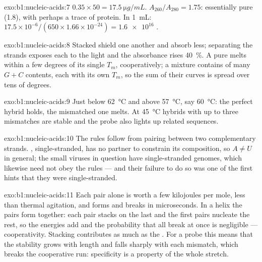 \begin{solution}{exo:b1:nucleic-acids:7}
$0.35\times 50 = \qty{17.5}{\micro g/mL}$. $A_{260}/A_{280} = 1.75$:
essentially pure  (1.8), with perhaps a trace of protein. In
\qty{1}{mL}: $17.5\times 10^{-6}/(650\times 1.66\times 10^{-24}) =
\num{1.6e16}$ .
\end{solution}

\begin{solution}{exo:b1:nucleic-acids:8}
Stacked  shield one another and absorb less; separating the
strands exposes each  to the light and the absorbance rises
\qty{40}{\%}. A pure  melts within a few degrees of its single
$T_m$, cooperatively; a mixture contains  of many $G + C$ contents,
each with its own $T_m$, so the sum of their curves is spread over
tens of degrees.
\end{solution}

\begin{solution}{exo:b1:nucleic-acids:9}
Just below \qty{62}{\celsius} and above \qty{57}{\celsius}, say
\qty{60}{\celsius}: the perfect hybrid holds, the mismatched one
melts. At \qty{45}{\celsius} hybrids with up to three mismatches are
stable and the probe also lights up related sequences.
\end{solution}

\begin{solution}{exo:b1:nucleic-acids:10}
The rules follow from  pairing between two complementary strands.
, single-stranded, has no partner to constrain its composition, so
$A \neq U$ in general; the small viruses in question have
single-stranded  genomes, which likewise need not obey the rules ---
and their failure to do so was one of the first hints that they were
single-stranded.
\end{solution}

\begin{solution}{exo:b1:nucleic-acids:11}
Each pair alone is worth a few kilojoules per mole, less than thermal
agitation, and forms and breaks in microseconds. In a helix the pairs
form together: each pair stacks on the last and the first pairs
nucleate the rest, so the energies add and the probability that all
break at once is negligible --- cooperativity. Stacking contributes as
much as the . For a probe this means that the stability
grows with length and falls sharply with each mismatch, which breaks
the cooperative run: specificity is a property of the whole stretch.
\end{solution}

